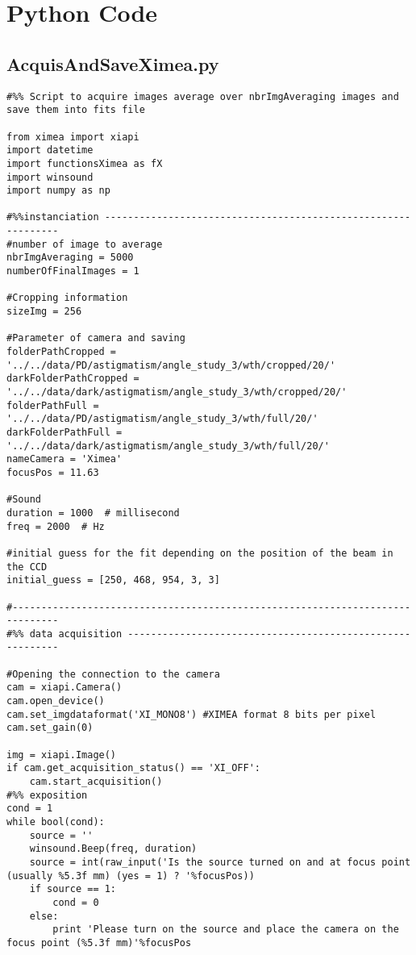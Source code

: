 

\chapter{Python Code}

\label{App:pythonCode}

\section{AcquisAndSaveXimea.py}

\begin{lstlisting}
#%% Script to acquire images average over nbrImgAveraging images and save them into fits file

from ximea import xiapi
import datetime
import functionsXimea as fX
import winsound
import numpy as np

#%%instanciation --------------------------------------------------------------
#number of image to average
nbrImgAveraging = 5000
numberOfFinalImages = 1

#Cropping information
sizeImg = 256

#Parameter of camera and saving
folderPathCropped = '../../data/PD/astigmatism/angle_study_3/wth/cropped/20/'
darkFolderPathCropped = '../../data/dark/astigmatism/angle_study_3/wth/cropped/20/'
folderPathFull = '../../data/PD/astigmatism/angle_study_3/wth/full/20/'
darkFolderPathFull = '../../data/dark/astigmatism/angle_study_3/wth/full/20/'
nameCamera = 'Ximea'
focusPos = 11.63

#Sound
duration = 1000  # millisecond
freq = 2000  # Hz

#initial guess for the fit depending on the position of the beam in the CCD
initial_guess = [250, 468, 954, 3, 3]

#------------------------------------------------------------------------------
#%% data acquisition ----------------------------------------------------------

#Opening the connection to the camera
cam = xiapi.Camera()
cam.open_device()
cam.set_imgdataformat('XI_MONO8') #XIMEA format 8 bits per pixel
cam.set_gain(0)

img = xiapi.Image()
if cam.get_acquisition_status() == 'XI_OFF':
    cam.start_acquisition()
#%% exposition
cond = 1
while bool(cond):
    source = ''
    winsound.Beep(freq, duration)
    source = int(raw_input('Is the source turned on and at focus point (usually %5.3f mm) (yes = 1) ? '%focusPos))
    if source == 1:
        cond = 0
    else:
        print 'Please turn on the source and place the camera on the focus point (%5.3f mm)'%focusPos


\end{lstlisting}
